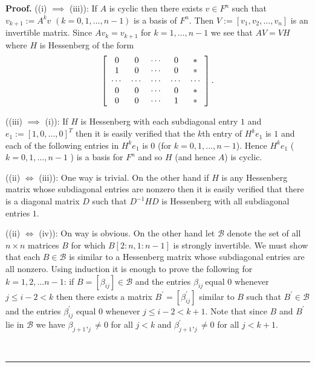\documentclass{article}%
\newenvironment{proof}[1][Proof]{\noindent\textbf{#1.} }{\ \rule{0.5em}{0.5em}}
\begin{document}
\begin{proof}
((i) $\implies$ (iii)): If $A$ is cyclic then there exists $v\in F^{n}$ such
that $v_{k+1}:=A^{k}v$ $(k=0,1,...,n-1)$ is a basis of $F^{n}$. Then
$V:=[v_{1},v_{2},...,v_{n}]$ is an invertible matrix. Since $Av_{k}=v_{k+1}$
for $k=1,...,n-1$ we see that $AV=VH$ where $H$ is Hessenberg of the form
\[
\left[
\begin{array}
[c]{ccccc}%
0 & 0 & \cdots & 0 & \ast\\
1 & 0 & \cdots & 0 & \ast\\
\cdots & \cdots & \cdots & \cdots & \cdots\\
0 & 0 & \cdots & 0 & \ast\\
0 & 0 & \cdots & 1 & \ast
\end{array}
\right]  .
\]


((iii) $\implies$ (i)): If $H$ is Hessenberg with each subdiagonal entry $1$
and $e_{1}:=\left[  1,0,...,0\right]  ^{T}$ then it is easily verified that
the $k$th entry of $H^{k}e_{1}$ is $1$ and each of the following entries in
$H^{k}e_{1}$ is $0$ (for $k=0,1,...,n-1$). Hence $H^{k}e_{1}$ ($k=0,1,...,n-1$%
) is a basis for $F^{n}$ and so $H$ (and hence $A$) is cyclic.

((ii) $\iff$ (iii)): One way is trivial. On the other hand if $H$ is any
Hessenberg matrix whose subdiagonal entries are nonzero then it is easily
verified that there is a diagonal matrix $D$ such that $D^{-1}HD$ is
Hessenberg with all subdiagonal entries $1$.

((ii) $\iff$ (iv)): On way is obvious. On the other hand let $\mathcal{B}$
denote the set of all $n\times n$ matrices $B$ for which $B[2:n,1:n-1]$ is
strongly invertible. We must show that each $B\in\mathcal{B}$ is similar to a
Hessenberg matrix whose subdiagonal entries are all nonzero. Using induction
it is enough to prove the following for $k=1,2,...n-1$: if $B=[\beta_{ij}%
]\in\mathcal{B}$ and the entries $\beta_{ij}\ $equal $0$ whenever $j\leq
i-2<k$ then there exists a matrix $B^{\prime}=[\beta_{ij}^{\prime}]$ similar
to $B$ such that $B^{\prime}\in\mathcal{B}$ and the entries $\beta
_{ij}^{\prime}$ equal $0$ whenever $j\leq i-2<k+1$. Note that since $B$ and
$B^{\prime}$ lie in $\mathcal{B}$ we have $\beta_{j+1},_{j}\neq0$ for all
$j<k$ and $\beta_{j+1}^{\prime},_{j}\neq0$ for all $j<k+1$.


\end{proof}
\end{document}

